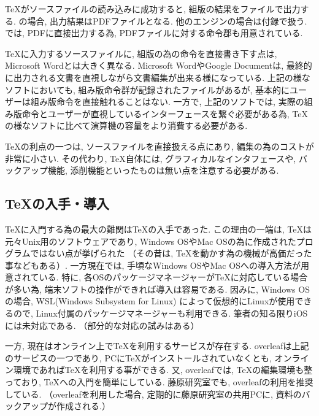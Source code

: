 \documentclass[12pt,xelatex,ja=standard]{bxjsarticle}
\begin{document}
\TeX がソースファイルの読み込みに成功すると,
組版の結果をファイルで出力する.
\XeLaTeX の場合,
出力結果はPDFファイルとなる.
他のエンジンの場合は付録で扱う.
\XeLaTeX では, PDFに直接出力する為,
PDFファイルに対する命令郡も用意されている.

\TeX に入力するソースファイルに,
組版の為の命令を直接書き下す点は,
Microsoft Wordとは大きく異なる.
Microsoft WordやGoogle Documentは,
最終的に出力される文書を直視しながら文書編集が出来る様になっている.
上記の様なソフトにおいても,
組み版命令群が記録されたファイルがあるが,
基本的にユーザーは組み版命令を直接触れることはない.
一方で, 上記のソフトでは,
実際の組み版命令とユーザーが直視しているインターフェースを繋ぐ必要がある為,
\TeX の様なソフトに比べて演算機の容量をより消費する必要がある.

\TeX の利点の一つは,
ソースファイルを直接扱える点にあり,
編集の為のコストが非常に小さい.
その代わり,
\TeX 自体には, グラフィカルなインタフェースや,
バックアップ機能, 添削機能といったものは無い点を注意する必要がある.

\subsection{\TeX の入手・導入}
\TeX に入門する為の最大の難関は\TeX の入手であった.
この理由の一端は,
\TeX は元々Unix用のソフトウェアであり,
Windows OSやMac OSの為に作成されたプログラムではない点が挙げられた
（その昔は, \TeX を動かす為の機械が高価だった事などもある）.
一方現在では,
手頃なWindows OSやMac OSへの導入方法が用意されている.
特に, 各OSのパッケージマネージャーが\TeX に対応している場合が多い為,
端末ソフトの操作ができれば導入は容易である.
因みに, Windows OSの場合,
WSL(Windows Subsystem for Linux)
によって仮想的にLinuxが使用できるので,
Linux付属のパッケージマネージャーも利用できる.
筆者の知る限りiOSには未対応である.
（部分的な対応の試みはある）

一方, 現在はオンライン上で\TeX を利用するサービスが存在する.
overleafは上記のサービスの一つであり,
PCに\TeX がインストールされていなくとも,
オンライン環境であれば\TeX を利用する事ができる.
又, overleafでは,
\TeX の編集環境も整っており,
\TeX への入門を簡単にしている.
藤原研究室でも,
overleafの利用を推奨している.
（overleafを利用した場合,
定期的に藤原研究室の共用PCに,
資料のバックアップが作成される.）
\end{document}
